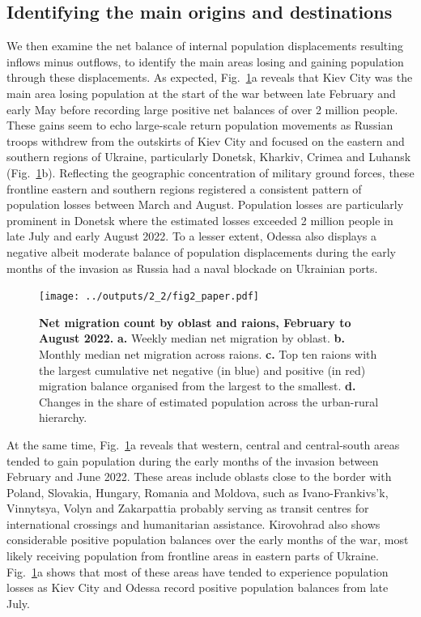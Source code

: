 \documentclass[
  11pt,
]{article}
\begin{document}
\subsection{Identifying the main origins and
destinations}\label{sec-odm}

We then examine the net balance of internal population displacements
resulting inflows minus outflows, to identify the main areas losing and
gaining population through these displacements. As expected,
Fig.~\ref{fig-heatmaps}a reveals that Kiev City was the main area losing
population at the start of the war between late February and early May
before recording large positive net balances of over 2 million people.
These gains seem to echo large-scale return population movements as
Russian troops withdrew from the outskirts of Kiev City and focused on
the eastern and southern regions of Ukraine, particularly Donetsk,
Kharkiv, Crimea and Luhansk (Fig.~\ref{fig-heatmaps}b). Reflecting the
geographic concentration of military ground forces, these frontline
eastern and southern regions registered a consistent pattern of
population losses between March and August. Population losses are
particularly prominent in Donetsk where the estimated losses exceeded 2
million people in late July and early August 2022. To a lesser extent,
Odessa also displays a negative albeit moderate balance of population
displacements during the early months of the invasion as Russia had a
naval blockade on Ukrainian ports.

\begin{figure}[h]

\begin{minipage}{\linewidth}

\texttt{[image: ../outputs/2\_2/fig2\_paper.pdf]}

\end{minipage}%

\caption{\label{fig-heatmaps}\textbf{Net migration count by oblast and
raions, February to August 2022.} \textbf{a.} Weekly median net
migration by oblast. \textbf{b.} Monthly median net migration across
raions. \textbf{c.} Top ten raions with the largest cumulative net
negative (in blue) and positive (in red) migration balance organised
from the largest to the smallest. \textbf{d.} Changes in the share of
estimated population across the urban-rural hierarchy.}

\end{figure}%

At the same time, Fig.~\ref{fig-heatmaps}a reveals that western, central
and central-south areas tended to gain population during the early
months of the invasion between February and June 2022. These areas
include oblasts close to the border with Poland, Slovakia, Hungary,
Romania and Moldova, such as Ivano-Frankivs'k, Vinnytsya, Volyn and
Zakarpattia probably serving as transit centres for international
crossings and humanitarian assistance. Kirovohrad also shows
considerable positive population balances over the early months of the
war, most likely receiving population from frontline areas in eastern
parts of Ukraine. Fig.~\ref{fig-heatmaps}a shows that most of these
areas have tended to experience population losses as Kiev City and
Odessa record positive population balances from late July.
\end{document}
